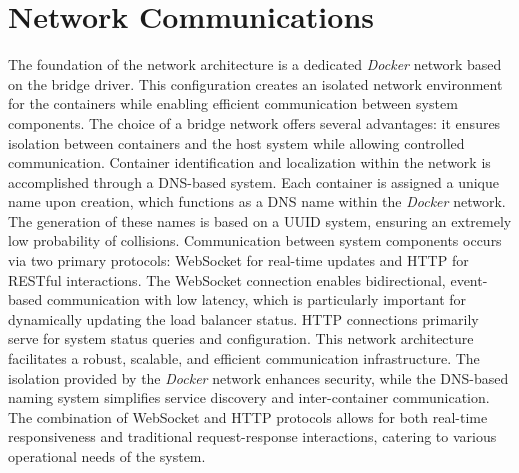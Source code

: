 \documentclass[twocolumn]{webofc}
\begin{document}
\section{Network Communications}
The foundation of the network architecture is a dedicated \textit{Docker} network based on the bridge driver. This configuration creates an isolated network environment for the containers while enabling efficient communication between system components. The choice of a bridge network offers several advantages: it ensures isolation between containers and the host system while allowing controlled communication\cite{docker_bridge_network}. Container identification and localization within the network is accomplished through a DNS-based system. Each container is assigned a unique name upon creation, which functions as a DNS name within the \textit{Docker} network. The generation of these names is based on a UUID system, ensuring an extremely low probability of collisions\cite{uuid}. Communication between system components occurs via two primary protocols: WebSocket for real-time updates and HTTP for RESTful interactions. The WebSocket connection enables bidirectional, event-based communication with low latency, which is particularly important for dynamically updating the load balancer status. HTTP connections primarily serve for system status queries and configuration. This network architecture facilitates a robust, scalable, and efficient communication infrastructure. The isolation provided by the \textit{Docker} network enhances security, while the DNS-based naming system simplifies service discovery and inter-container communication. The combination of WebSocket and HTTP protocols allows for both real-time responsiveness and traditional request-response interactions, catering to various operational needs of the system.
\end{document}
